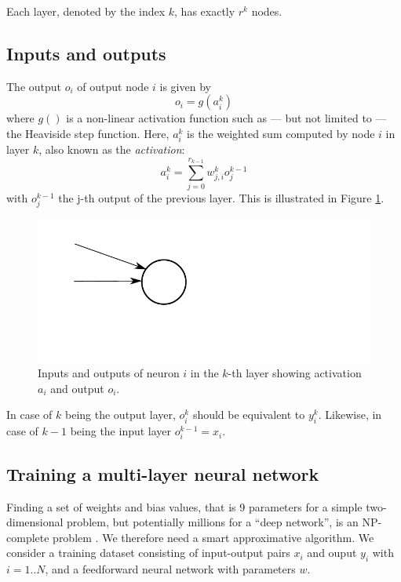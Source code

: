 \documentclass[paper=6.14in:9.21in,pagesize=pdftex,11pt,twoside,openright]{scrbook}
\begin{document}
Each layer, denoted by the index $k$, has exactly $r^k$ nodes.

\subsection{Inputs and outputs}

The output $o_i$ of output node $i$ is given by
\begin{equation}
o_i=g(a_i^k)
\end{equation}
where $g()$ is a non-linear activation function such as --- but not limited to --- the Heaviside step function. Here, $a_i^k$ is the weighted sum computed by node $i$ in layer $k$, also known as the \emph{activation}:
\begin{equation}
a_i^k=\sum_{j=0}^{r_{k-1}}w_{j,i}^ko_j^{k-1}
\end{equation}
with $o_j^{k-1}$ the j-th output of the previous layer. This is illustrated in Figure \ref{fig:backpropnotation2}.

\begin{figure}[!htb]
\centering
\includegraphics[width=0.7\columnwidth]{figs/backpropnotation2}
\caption{Inputs and outputs of neuron $i$ in the $k$-th layer showing activation $a_i$ and output $o_i$.\label{fig:backpropnotation2}} 
\end{figure}

In case of $k$ being the output layer, $o_i^k$ should be equivalent to $y_i^k$. Likewise, in case of $k-1$ being the input layer $o_i^{k-1}=x_i$.

\subsection{Training a multi-layer neural network}

Finding a set of weights and bias values, that is 9 parameters for a simple two-dimensional problem, but potentially millions for a ``deep network'', is an NP-complete problem \cite{blum1992training}. We therefore need a smart approximative algorithm. We consider a training dataset consisting of input-output pairs $x_i$ and ouput $y_i$ with $i=1..N$, and a feedforward neural network with parameters $w$.
\end{document}
